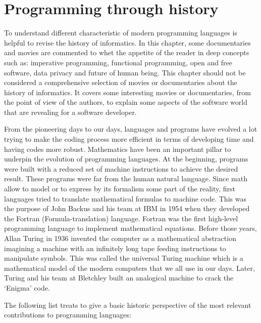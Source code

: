 \newpage 
\section{Programming through history}   \label{sec:films}
To understand different characteristic of modern programming languages
is helpful to revise the history of informatics. In this chapter, 
some documentaries and movies are commented to whet the appetite of the 
reader in deep concepts such as: imperative programming, functional programming, 
open and free software, data privacy and future of human being. 
This chapter should not be considered  a comprehensive selection of movies 
or documentaries about the history of informatics. 
It covers some interesting movies or documentaries, 
from the point of view of the authors, to explain some aspects 
of the software world that are revealing for a software 
developer.  
  
From the pioneering days to our days, languages and programs have evolved 
a lot trying to make the coding process more efficient in terms of developing time 
and having codes more robust. Mathematics have been an important pillar to underpin
the evolution of programming  languages. 
At the beginning, programs were built with a reduced set of machine instructions 
to achieve the desired result. These programs were far from the human natural language.
Since math allow to model or to express by its formalism some part of the reality, first 
languages tried to translate mathematical formulas to machine code. This was the purpose 
of John Backus and his team at IBM in 1954 when they developed 
the Fortran (Formula-translation) language. 
Fortran was the first high-level programming language to implement mathematical equations. 
Before those years, Allan Turing in 1936 invented the computer as a mathematical  abstraction 
imagining a machine with an infinitely long tape feeding instructions to manipulate symbols. 
This was called the universal Turing machine 
which is a mathematical model of the modern computers that we all use in our days. 
Later, Turing and his team at Bletchley built an analogical machine 
to crack the ‘Enigma’ code. 
  
  
\newpage 
The following list treats to give a basic historic perspective
of the most relevant contributions  to programming languages:
 
